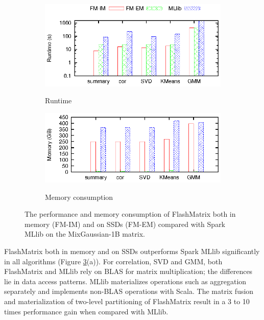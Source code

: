 \begin{figure}
  \vspace{-5pt}
	\centering
	\footnotesize
	\begin{subfigure}{.5\textwidth}
		\includegraphics{FlashMatrix_figs/FM-vs-spark.eps}
		\label{perf:rt}
		\vspace{-12pt}
		\caption{Runtime}
	\end{subfigure}

	\vspace{3pt}
	\begin{subfigure}{.5\textwidth}
		\includegraphics{FlashMatrix_figs/FM-vs-spark-mem.eps}
		\label{perf:mem}
		\vspace{-12pt}
		\caption{Memory consumption}
	\end{subfigure}
	\caption{The performance and memory consumption of FlashMatrix both
		in memory (FM-IM) and on SSDs (FM-EM) compared with Spark MLlib
		on the MixGaussian-1B matrix.}
	\label{perf:fm}
  \vspace{-10pt}
\end{figure}

FlashMatrix both in memory and on SSDs outperforms Spark MLlib significantly
in all algorithms (Figure \ref{perf:fm}(a)). For 
correlation, SVD and GMM, both FlashMatrix and MLlib
rely on BLAS for matrix multiplication; the differences lie in data access patterns.
MLlib materializes operations such as aggregation separately and implements
non-BLAS operations with Scala. The matrix fusion and materialization of
two-level partitioning of FlashMatrix result in a 3 to 10 times performance
gain when compared with MLlib.

